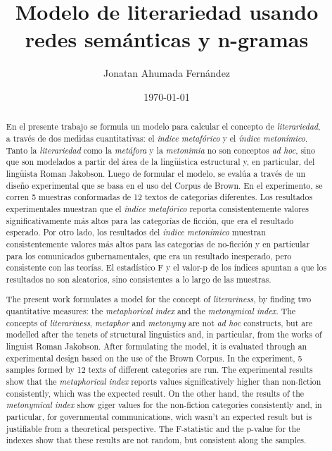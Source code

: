 \documentclass[12pt,letterpaper,twoside]{article}
\author{Jonatan Ahumada Fernández}
\date{\today}
\title{Modelo de literariedad usando redes semánticas y n-gramas}
\begin{document}
\maketitle
\tableofcontents

\doublespacing
\raggedright
\setlength{\parindent}{1.25cm}






\begin{abstract}
    En el presente trabajo se formula un modelo para calcular el
   concepto de \emph{literariedad}, a través de dos medidas cuantitativas:
   el \emph{indice metafórico} y el \emph{índice metonímico}. Tanto la
   \emph{literariedad} como la \emph{metáfora} y la \emph{metonimia} no son conceptos
   \emph{ad hoc}, sino que son modelados a partir del área de la
   lingüistica estructural y, en particular, del lingüista Roman
   Jakobson. Luego de formular el modelo, se evalúa a través de un
   diseño experimental que se basa en el uso del Corpus de Brown. En
   el experimento, se corren 5 muestras conformadas de 12 textos de
   categorias diferentes. Los resultados experimentales muestran que
   el \emph{índice metafórico} reporta consistentemente valores
   significativamente más altos para las categorías de ficción, que
   era el resultado esperado. Por otro lado, los resultados del
   \emph{índice metonímico} muestran consistentemente valores más altos
   para las categorías de no-ficción y en particular para los
   comunicados gubernamentales, que era un resultado inesperado, pero
   consistente con las teorías. El estadístico F y el valor-p de los
   índices apuntan a que los resultados no son aleatorios, sino  consistentes
   a lo largo de las muestras. 
\end{abstract}

\begin{abstract}
 The present work formulates a model for the concept of \emph{literariness}, by
 finding two quantitative measures: the \emph{metaphorical index} and the \emph{metonymical index}.
 The concepts of \emph{literariness}, \emph{metaphor} and \emph{metonymy} are not \emph{ad hoc}
 constructs, but are modelled after the tenets of structural linguistics and, in particular,
 from the works of linguist Roman Jakobson. After formulating the model, it is evaluated through
 an experimental design based on the use of the Brown Corpus. In the experiment, 5 samples
 formed by 12 texts of different categories are run.  The experimental results show that
 the \emph{metaphorical index} reports values significatively higher than non-fiction consistently,
 which was the expected result. On the other hand, the results of the \emph{metonymical index} show
 giger values for the non-fiction categories consistently and, in particular, for governmental
 communications, wich wasn't an expected result but is justifiable from a theoretical perspective.
 The F-statistic and the p-value for the indexes show that these results are not random, but
 consistent along the samples.
\end{abstract}
\end{document}
